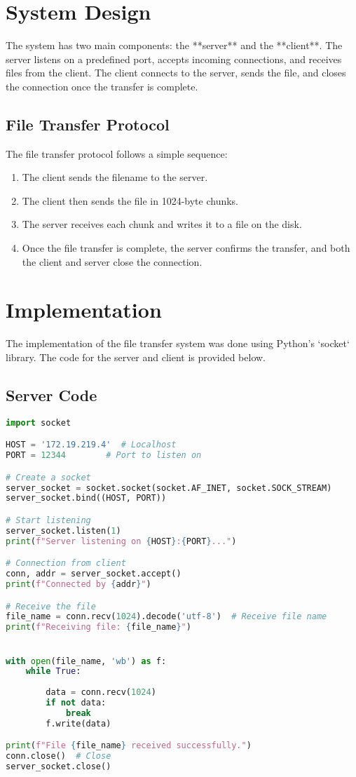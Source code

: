 \documentclass[a4paper,12pt]{article}
\begin{document}
\section{System Design}
The system has two main components: the **server** and the **client**. The server listens on a predefined port, accepts incoming connections, and receives files from the client. The client connects to the server, sends the file, and closes the connection once the transfer is complete.

\subsection{File Transfer Protocol}
The file transfer protocol follows a simple sequence:
\begin{enumerate}
    \item The client sends the filename to the server.
    \item The client then sends the file in 1024-byte chunks.
    \item The server receives each chunk and writes it to a file on the disk.
    \item Once the file transfer is complete, the server confirms the transfer, and both the client and server close the connection.
\end{enumerate}

\section{Implementation}
The implementation of the file transfer system was done using Python's `socket` library. The code for the server and client is provided below.

\subsection{Server Code}

\begin{lstlisting}[language=Python, caption=Server Code]
import socket

HOST = '172.19.219.4'  # Localhost
PORT = 12344        # Port to listen on

# Create a socket 
server_socket = socket.socket(socket.AF_INET, socket.SOCK_STREAM)
server_socket.bind((HOST, PORT))

# Start listening 
server_socket.listen(1)
print(f"Server listening on {HOST}:{PORT}...")

# Connection from client
conn, addr = server_socket.accept()
print(f"Connected by {addr}")

# Receive the file
file_name = conn.recv(1024).decode('utf-8')  # Receive file name
print(f"Receiving file: {file_name}")


with open(file_name, 'wb') as f:
    while True:
        
        data = conn.recv(1024)
        if not data:
            break  
        f.write(data)

print(f"File {file_name} received successfully.")
conn.close()  # Close 
server_socket.close()  
\end{lstlisting}
\end{document}
